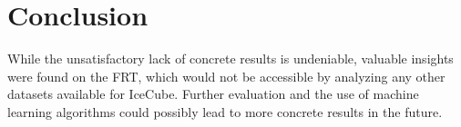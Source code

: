 \section{Conclusion}
While the unsatisfactory lack of concrete results is undeniable, valuable insights were found on the FRT, which would not be accessible by analyzing any other 
datasets available for IceCube. Further evaluation and the use of machine learning algorithms could possibly lead to more concrete results in the future.